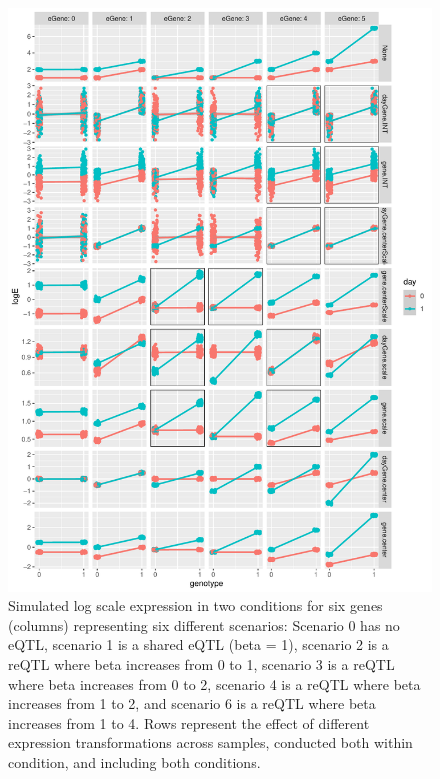 \begin{figure}
    \centering
    \includegraphics[width=1.0\textwidth,page=1]{mainmatter/figures/chapter_03/simulate_expression_transforms.pdf}
    \caption{
        Simulated log scale expression in two conditions for six genes (columns) representing six different scenarios:
            Scenario 0 has no \gls{eQTL}, 
            scenario 1 is a shared eQTL (beta = 1), 
            scenario 2 is a \gls{reQTL} where beta increases from 0 to 1,
            scenario 3 is a \gls{reQTL} where beta increases from 0 to 2,
            scenario 4 is a \gls{reQTL} where beta increases from 1 to 2,
            and scenario 6 is a \gls{reQTL} where beta increases from 1 to 4.
            Rows represent the effect of different expression transformations across samples, conducted both within condition, and including both conditions.
    }
    \label{fig:hird_eQTL_expressionTransform_sims}
\end{figure}

